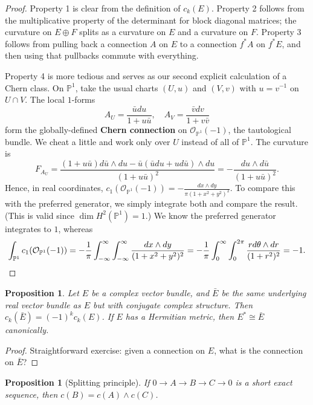 \documentclass{report}
\theoremstyle{plain}
\newtheorem{proposition}[theorem]{Proposition}
\theoremstyle{definition}
\theoremstyle{remark}
\newcommand{\bP}{\mathbb{P}}
\newcommand{\cO}{\mathcal{O}}
\begin{document}
\begin{proof}
  Property 1 is clear from the definition of $c_k(E)$. Property 2
  follows from the multiplicative property of the determinant for
  block diagonal matrices; the curvature on $E \oplus F$ splits as a
  curvature on $E$ and a curvature on $F$. Property 3 follows from
  pulling back a connection $A$ on $E$ to a connection $f^*A$ on
  $f^*E$, and then using that pullbacks commute with everything.

  Property 4 is more tedious and serves as our second explicit
  calculation of a Chern class. On $\bP^1$, take the usual charts $(U,
  u)$ and $(V, v)$ with $u = v^{-1}$ on $U \cap V$. The local
  $1$-forms
  \[ A_U = \frac{\bar{u} du}{1 + u\bar{u}}, \quad A_V = \frac{\bar{v} dv}{1 + v \bar{v}} \]
  form the globally-defined {\bf Chern connection} on
  $\cO_{\bP^1}(-1)$, the tautological bundle. We cheat a little and
  work only over $U$ instead of all of $\bP^1$. The curvature is
  \[ F_{A_U} = \frac{(1 + u\bar{u}) d\bar{u} \wedge du - \bar{u} (\bar{u} du + u d\bar{u}) \wedge du}{(1 + u\bar{u})^2} = -\frac{du \wedge d\bar{u}}{(1 + u\bar{u})^2}. \]
  Hence, in real coordinates, $c_1(\cO_{\bP^1}(-1)) = -\frac{dx \wedge
    dy}{\pi(1 + x^2 + y^2)^2}$. To compare this with the preferred
  generator, we simply integrate both and compare the result. (This is
  valid since $\dim H^2(\bP^1) = 1$.) We know the preferred generator
  integrates to $1$, whereas
  \[ \int_{\bP^1} c_1(\cO_{\bP^1}(-1)) = -\frac{1}{\pi} \int_{-\infty}^\infty \int_{-\infty}^\infty \frac{dx \wedge dy}{(1 + x^2 + y^2)^2} = -\frac{1}{\pi} \int_0^\infty \int_0^{2\pi} \frac{r d\theta \wedge dr}{(1 + r^2)^2} = -1. \qedhere \]
\end{proof}

\begin{proposition} \label{thm:chern-dual}
  Let $E$ be a complex vector bundle, and $\bar{E}$ be the same
  underlying real vector bundle as $E$ but with conjugate complex
  structure. Then $c_k(\bar{E}) = (-1)^k c_k(E)$. If $E$ has a
  Hermitian metric, then $E^* \cong \bar{E}$ canonically.
\end{proposition}

\begin{proof}
  Straightforward exercise: given a connection on $E$, what is the
  connection on $\bar{E}$?
\end{proof}

\begin{proposition}[Splitting principle]
  If $0 \to A \to B \to C \to 0$ is a short exact sequence, then $c(B)
  = c(A) \wedge c(C)$.
\end{proposition}
\end{document}

